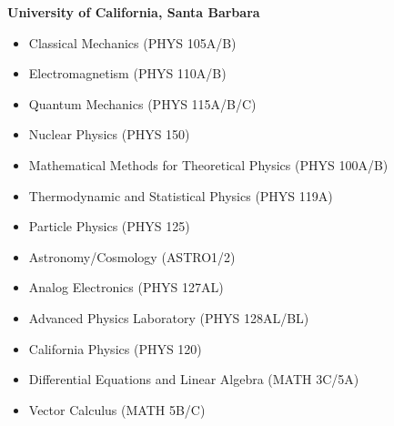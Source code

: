 \textbf{University of California, Santa Barbara}\\[-2.3ex]
\begin{itemize}[leftmargin=4ex] \itemsep -2pt
\item Classical Mechanics ({\footnotesize{PHYS 105A/B}}) 
\item Electromagnetism ({\footnotesize{PHYS 110A/B}}) 
\item Quantum Mechanics ({\footnotesize{PHYS 115A/B/C}}) 
\item Nuclear Physics ({\footnotesize{PHYS 150}}) 
\item Mathematical Methods for Theoretical Physics ({\footnotesize{PHYS 100A/B}}) 
\item Thermodynamic and Statistical Physics ({\footnotesize{PHYS 119A}}) 
\item Particle Physics ({\footnotesize{PHYS 125}}) 
\item Astronomy/Cosmology ({\footnotesize{ASTRO1/2}})
\item Analog Electronics ({\footnotesize{PHYS 127AL}}) 
\item Advanced Physics Laboratory ({\footnotesize{PHYS 128AL/BL}}) 
\item California Physics ({\footnotesize{PHYS 120}})
\item Differential Equations and Linear Algebra ({\footnotesize{MATH 3C/5A}}) 
\item Vector Calculus ({\footnotesize{MATH 5B/C}}) 
\end{itemize}
